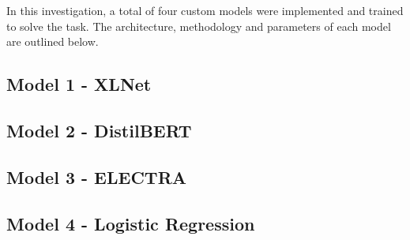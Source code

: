 In this investigation, a total of four custom models were implemented and trained to solve the task. The architecture, methodology and parameters of each model are outlined below. 

\subsection{Model 1 - XLNet}


\subsection{Model 2 - DistilBERT}


\subsection{Model 3 - ELECTRA}


\subsection{Model 4 - Logistic Regression}

